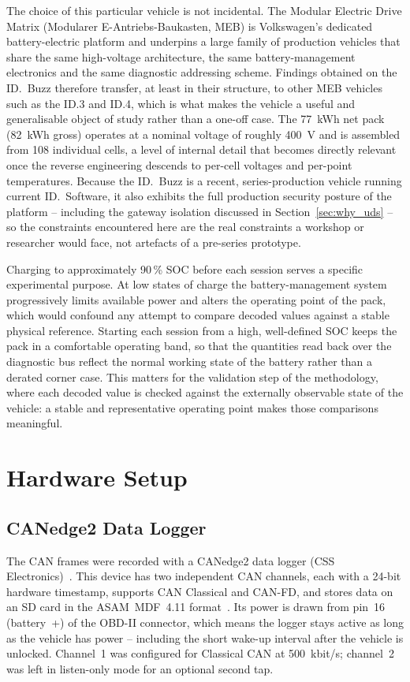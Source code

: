 \documentclass[11pt,a4paper,oneside,parskip=half]{scrreprt}
\begin{document}
The choice of this particular vehicle is not incidental. The Modular Electric Drive Matrix (Modularer E-Antriebs-Baukasten, MEB) is Volkswagen's dedicated battery-electric platform and underpins a large family of production vehicles that share the same high-voltage architecture, the same battery-management electronics and the same diagnostic addressing scheme. Findings obtained on the ID.~Buzz therefore transfer, at least in their structure, to other MEB vehicles such as the ID.3 and ID.4, which is what makes the vehicle a useful and generalisable object of study rather than a one-off case. The 77~kWh net pack (82~kWh gross) operates at a nominal voltage of roughly 400~V and is assembled from 108 individual cells, a level of internal detail that becomes directly relevant once the reverse engineering descends to per-cell voltages and per-point temperatures. Because the ID.~Buzz is a recent, series-production vehicle running current ID.~Software, it also exhibits the full production security posture of the platform -- including the gateway isolation discussed in Section~\ref{sec:why_uds} -- so the constraints encountered here are the real constraints a workshop or researcher would face, not artefacts of a pre-series prototype.

Charging to approximately 90\,\% SOC before each session serves a specific experimental purpose. At low states of charge the battery-management system progressively limits available power and alters the operating point of the pack, which would confound any attempt to compare decoded values against a stable physical reference. Starting each session from a high, well-defined SOC keeps the pack in a comfortable operating band, so that the quantities read back over the diagnostic bus reflect the normal working state of the battery rather than a derated corner case. This matters for the validation step of the methodology, where each decoded value is checked against the externally observable state of the vehicle: a stable and representative operating point makes those comparisons meaningful.

\section{Hardware Setup}
\subsection{CANedge2 Data Logger}
The CAN frames were recorded with a CANedge2 data logger (CSS Electronics)~\cite{csselectronics_canedge2}. This device has two independent CAN channels, each with a 24-bit hardware timestamp, supports CAN Classical and CAN-FD, and stores data on an SD card in the ASAM~MDF~4.11 format~\cite{asammdf}. Its power is drawn from pin~16 (battery~+) of the OBD-II connector, which means the logger stays active as long as the vehicle has power -- including the short wake-up interval after the vehicle is unlocked. Channel~1 was configured for Classical CAN at 500~kbit/s; channel~2 was left in listen-only mode for an optional second tap.
\end{document}
